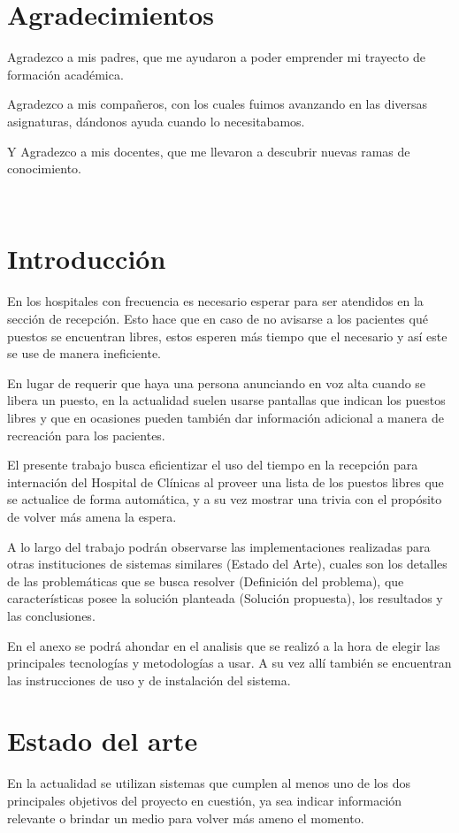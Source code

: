 \documentclass[twoside]{article}
\begin{document}
\section*{Agradecimientos}

Agradezco a mis padres, que me ayudaron a poder emprender mi trayecto de formación académica.

Agradezco a mis compañeros, con los cuales fuimos avanzando en las diversas asignaturas, dándonos ayuda cuando lo necesitabamos.

Y Agradezco a mis docentes, que me llevaron a descubrir nuevas ramas de conocimiento.
\newpage
\
\newpage
\tableofcontents
\newpage
\
\newpage
\listoffigures
\newpage
\
\newpage
\section{Introducción}
En los hospitales con frecuencia es necesario esperar para ser atendidos en la sección de recepción. Esto hace que en caso de no avisarse a los pacientes qué puestos se encuentran libres, estos esperen más tiempo que el necesario y así este se use de manera ineficiente.

En lugar de requerir que haya una persona anunciando en voz alta cuando se libera un puesto, en la actualidad suelen usarse pantallas que indican los puestos libres y que en ocasiones pueden también dar información adicional a manera de recreación para los pacientes.

El presente trabajo busca eficientizar el uso del tiempo en la recepción para internación del Hospital de Clínicas al proveer una lista de los puestos libres que se actualice de forma automática, y a su vez mostrar una trivia con el propósito de volver más amena la espera.

A lo largo del trabajo podrán observarse las implementaciones realizadas para otras instituciones de sistemas similares (Estado del Arte), cuales son los detalles de las problemáticas que se busca resolver (Definición del problema), que características posee la solución planteada (Solución propuesta), los resultados y las conclusiones.

En el anexo se podrá ahondar en el analisis que se realizó a la hora de elegir las principales tecnologías y metodologías a usar. A su vez allí también se encuentran las instrucciones de uso y de instalación del sistema.
\newpage
\section{Estado del arte}
En la actualidad se utilizan sistemas que cumplen al menos uno de los dos principales objetivos del proyecto en cuestión, ya sea indicar información relevante o brindar un medio para volver más ameno el momento.
\end{document}
